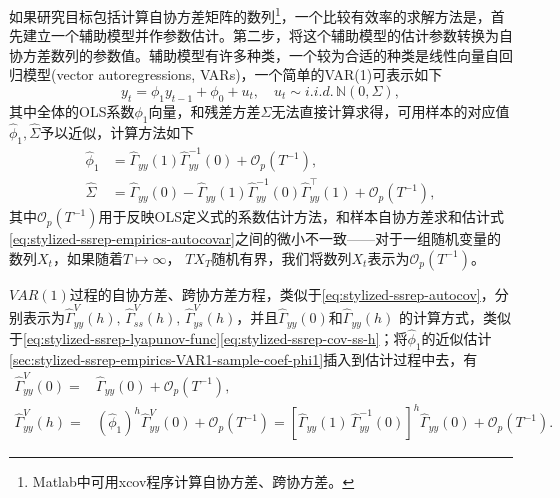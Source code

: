 如果研究目标包括计算自协方差矩阵的数列\footnote{Matlab中可用xcov程序计算自协方差、跨协方差。}，一个比较有效率的求解方法是，首先建立一个辅助模型并作参数估计。第二步，将这个辅助模型的估计参数转换为自协方差数列的参数值。辅助模型有许多种类，一个较为合适的种类是线性向量自回归模型(vector autoregressions, VARs)，一个简单的VAR(1)可表示如下
\begin{equation}
  \label{sec:stylized-ssrep-empirics-var1-def}
  y_{t} = \phi_{1} y_{t-1} + \phi_{0} + u_{t}, \quad u_{t} \sim i.i.d. \, \mathbb{N} \left(0, \Sigma \right),
\end{equation}
其中全体的OLS系数$\phi_{1}$向量，和残差方差$\Sigma$无法直接计算求得，可用样本的对应值$\hat{\phi}_{1}, \widehat{\Sigma}$予以近似，计算方法如下
\begin{align}
  \label{sec:stylized-ssrep-empirics-VAR1-sample-coef-phi1}
  \hat{\phi}_{1} & = \widehat{\Gamma}_{yy} \left( 1 \right)
  \widehat{\Gamma}_{yy}^{-1} \left( 0 \right) + \mathcal{O}_{p} \left( T ^{-1} \right), \\
  \label{sec:stylized-ssrep-empirics-VAR1-sample-coef-resvar}
  \widehat{\Sigma} & = \widehat{\Gamma}_{yy} \left( 0 \right)
  - \widehat{\Gamma}_{yy} \left( 1 \right)
  \widehat{\Gamma}_{yy}^{-1} \left( 0 \right)
  \widehat{\Gamma}_{yy}^{\top} \left( 1 \right)
  + \mathcal{O}_{p} \left( T ^{-1} \right),
\end{align}
其中$\mathcal{O}_{p} \left( T^{-1} \right)$用于反映OLS定义式的系数估计方法，和样本自协方差求和估计式\eqref{eq:stylized-ssrep-empirics-autocovar}之间的微小不一致——对于一组随机变量的数列$X_{t}$，如果随着$T \mapsto \infty$， $T X_{T}$随机有界，我们将数列$X_{t}$表示为$\mathcal{O}_{p} \left( T^{-1} \right)$。

$VAR(1)$过程的自协方差、跨协方差方程，类似于\eqref{eq:stylized-ssrep-autocov}，分别表示为$\widehat{\Gamma}_{yy}^{V}(h),\, \widehat{\Gamma}_{ss}^{V}(h), \, \widehat{\Gamma}_{ys}^{V}(h)$，并且$\widehat{\Gamma}_{yy}(0)$和$\widehat{\Gamma}_{yy}(h)$
的计算方式，类似于\eqref{eq:stylized-ssrep-lyapunov-func}\eqref{eq:stylized-ssrep-cov-ss-h}；将$\hat{\phi}_{1}$的近似估计\eqref{sec:stylized-ssrep-empirics-VAR1-sample-coef-phi1}插入到估计过程中去，有
\begin{align}
  \label{eq:stylized-ssrep-var1-autocov-yy0}
  \widehat{\Gamma}_{yy}^{V} \left( 0 \right) = & \widehat{\Gamma}_{yy} \left( 0 \right) + \mathcal{O}_{p} \left( T^{-1} \right), \\
  \label{eq:stylized-ssrep-var1-autocov-yyh}
  \widehat{\Gamma}_{yy}^{V} \left( h \right) = &
  \left( \hat{\phi}_{1} \right)^{h} \widehat{\Gamma}_{yy}^{V} \left( 0 \right) + \mathcal{O}_{p} \left( T^{-1} \right)
  = \left[ \widehat{\Gamma}_{yy} \left( 1 \right) \,
  \widehat{\Gamma}_{yy}^{-1} \left( 0 \right)
  \right]^{h}
  \widehat{\Gamma}_{yy} \left( 0 \right)
  + \mathcal{O}_{p} \left( T^{-1} \right).
\end{align}

